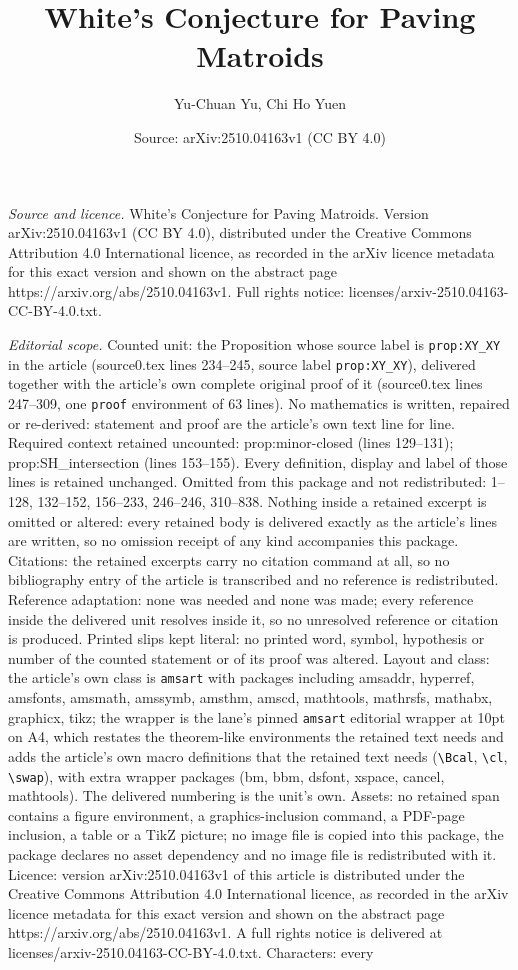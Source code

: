 \documentclass[10pt,a4paper]{amsart}
\title[White's Conjecture for Paving Matroids]{White's Conjecture for Paving Matroids}
\author{Yu-Chuan Yu, Chi Ho Yuen}
\date{Source: arXiv:2510.04163v1 (CC BY 4.0)}
\begin{document}
\maketitle

\noindent\emph{Source and licence.} White's Conjecture for Paving Matroids. Version arXiv:2510.04163v1 (CC BY 4.0), distributed under the Creative Commons Attribution 4.0 International licence, as recorded in the arXiv licence metadata for this exact version and shown on the abstract page https://arxiv.org/abs/2510.04163v1. Full rights notice: licenses/arxiv-2510.04163-CC-BY-4.0.txt.\par\smallskip

\noindent\textit{Editorial scope.} Counted unit: the Proposition whose source label is \texttt{prop:XY\_XY} in the article (source0.tex lines 234--245, source label \texttt{prop:XY\_XY}), delivered together with the article's own complete original proof of it (source0.tex lines 247--309, one \texttt{proof} environment of 63 lines). No mathematics is written, repaired or re-derived: statement and proof are the article's own text line for line. Required context retained uncounted: prop:minor-closed (lines 129--131); prop:SH\_intersection (lines 153--155). Every definition, display and label of those lines is retained unchanged. Omitted from this package and not redistributed: 1--128, 132--152, 156--233, 246--246, 310--838. Nothing inside a retained excerpt is omitted or altered: every retained body is delivered exactly as the article's lines are written, so no omission receipt of any kind accompanies this package. Citations: the retained excerpts carry no citation command at all, so no bibliography entry of the article is transcribed and no reference is redistributed. Reference adaptation: none was needed and none was made; every reference inside the delivered unit resolves inside it, so no unresolved reference or citation is produced. Printed slips kept literal: no printed word, symbol, hypothesis or number of the counted statement or of its proof was altered. Layout and class: the article's own class is \texttt{amsart} with packages including amsaddr, hyperref, amsfonts, amsmath, amssymb, amsthm, amscd, mathtools, mathrsfs, mathabx, graphicx, tikz; the wrapper is the lane's pinned \texttt{amsart} editorial wrapper at 10pt on A4, which restates the theorem-like environments the retained text needs and adds the article's own macro definitions that the retained text needs (\texttt{\textbackslash Bcal}, \texttt{\textbackslash cl}, \texttt{\textbackslash swap}), with extra wrapper packages (bm, bbm, dsfont, xspace, cancel, mathtools). The delivered numbering is the unit's own. Assets: no retained span contains a figure environment, a graphics-inclusion command, a PDF-page inclusion, a table or a TikZ picture; no image file is copied into this package, the package declares no asset dependency and no image file is redistributed with it. Licence: version arXiv:2510.04163v1 of this article is distributed under the Creative Commons Attribution 4.0 International licence, as recorded in the arXiv licence metadata for this exact version and shown on the abstract page https://arxiv.org/abs/2510.04163v1. A full rights notice is delivered at licenses/arxiv-2510.04163-CC-BY-4.0.txt. Characters: every 
\end{document}
